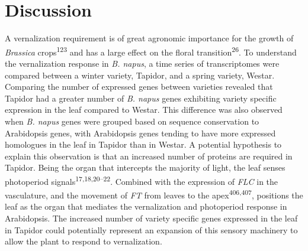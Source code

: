 \documentclass[12pt,]{book}
\begin{document}
\section{Discussion}\label{discussion-1}

A vernalization requirement is of great agronomic importance for the
growth of \emph{Brassica} crops\textsuperscript{123} and has a large
effect on the floral transition\textsuperscript{26}. To understand the
vernalization response in \emph{B. napus}, a time series of
transcriptomes were compared between a winter variety, Tapidor, and a
spring variety, Westar. Comparing the number of expressed genes between
varieties revealed that Tapidor had a greater number of \emph{B. napus}
genes exhibiting variety specific expression in the leaf compared to
Westar. This difference was also observed when \emph{B. napus} genes
were grouped based on sequence conservation to Arabidopsis genes, with
Arabidopsis genes tending to have more expressed homologues in the leaf
in Tapidor than in Westar. A potential hypothesis to explain this
observation is that an increased number of proteins are required in
Tapidor. Being the organ that intercepts the majority of light, the leaf
senses photoperiod signals\textsuperscript{17,18,20--22}. Combined with
the expression of \emph{FLC} in the vasculature, and the movement of
\emph{FT} from leaves to the apex\textsuperscript{406,407}, positions
the leaf as the organ that mediates the vernalization and photoperiod
response in Arabidopsis. The increased number of variety specific genes
expressed in the leaf in Tapidor could potentially represent an
expansion of this sensory machinery to allow the plant to respond to
vernalization.
\end{document}
